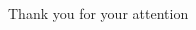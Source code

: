 \STANDARD{}
{
	\begin{columns}
		\begin{column}{0.35\textwidth}
			\begin{block}{~~~~~~Thank you}
				\centering
				for your attention
			\end{block}
		\end{column}
	\end{columns}
}


